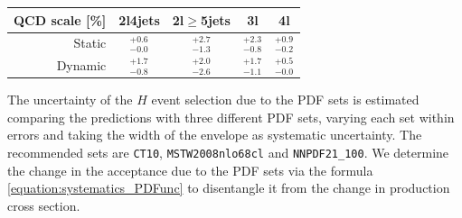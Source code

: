 \begin{table}
\begin{center} 
\begin{tabular}{r|c|c|c|c|}
QCD scale [\%] & 2l4jets & 2l$\geq$5jets & 3l & 4l \\
\hline
Static   & $^{+0.6}_{-0.0}$ & $^{+2.7}_{-1.3}$ & $^{+2.3}_{-0.8}$ & $^{+0.9}_{-0.2}$ \\
Dynamic  & $^{+1.7}_{-0.8}$ & $^{+2.0}_{-2.6}$ & $^{+1.7}_{-1.1}$ & $^{+0.5}_{-0.0}$ \\
\hline
\end{tabular}
\end{center}
\label{table:systematics_theosystttH}
\end{table}%

The uncertainty of the \ttbar$H$ event selection due to the PDF sets is estimated comparing the predictions with three different PDF sets, varying each set within errors and taking the width of the envelope as systematic uncertainty. The recommended sets are \verb+CT10+, \verb+MSTW2008nlo68cl+ and \verb+NNPDF21_100+. 
We determine the change in the acceptance due to the PDF sets via the formula \ref{equation:systematics_PDFunc} to disentangle it from the change in production cross section.

